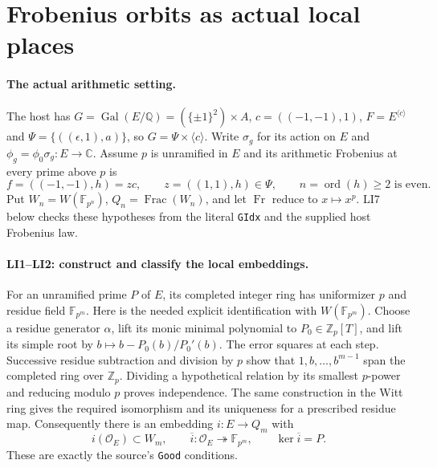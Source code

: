 \section{Frobenius orbits as actual local places}
\label{sec:local-identifications}


\paragraph{The actual arithmetic setting.}
The host has
$G=\operatorname{Gal}(E/\mathbb Q)=(\{\pm1\}^2)\times A$,
$c=((-1,-1),1)$, $F=E^{\langle c\rangle}$ and
$\Psi=\{((\epsilon,1),a)\}$, so $G=\Psi\times\langle c\rangle$.
Write $\sigma_g$ for its action on $E$ and
$\phi_g=\phi_0\sigma_g:E\to\mathbb C$.
Assume $p$ is unramified in $E$ and its arithmetic Frobenius at every
prime above $p$ is
\[
 f=((-1,-1),h)=zc,\qquad z=((1,1),h)\in\Psi,
 \qquad n=\operatorname{ord}(h)\ge2\text{ is even}.       \tag{LI.1}
\]
Put $W_n=W(\mathbb F_{p^n})$, $Q_n=\operatorname{Frac}(W_n)$,
and let $\operatorname{Fr}$ reduce to $x\mapsto x^p$.
LI7 below checks these hypotheses from the literal \texttt{GIdx}
and the supplied host Frobenius law.

\paragraph{LI1--LI2: construct and classify the local embeddings.}
For an unramified prime $P$ of $E$, its completed integer ring has
uniformizer $p$ and residue field $\mathbb F_{p^m}$. Here is the needed
explicit identification with $W(\mathbb F_{p^m})$.
Choose a residue generator $\alpha$, lift its monic minimal polynomial
to $P_0\in\mathbb Z_p[T]$, and lift its simple root by
$b\mapsto b-P_0(b)/P_0'(b)$. The error squares at each step.
Successive residue subtraction and division by $p$ show that
$1,b,\ldots,b^{m-1}$ span the completed ring over $\mathbb Z_p$.
Dividing a hypothetical relation by its smallest $p$-power and reducing
modulo $p$ proves independence. The same construction in the Witt ring
gives the required isomorphism and its uniqueness for a prescribed
residue map. Consequently there is an embedding $i:E\to Q_m$ with
\[
 i(\mathcal O_E)\subset W_m,\qquad
 \overline i:\mathcal O_E\twoheadrightarrow\mathbb F_{p^m},
 \qquad\ker\overline i=P.                               \tag{LI.2}
\]
These are exactly the source's \texttt{Good} conditions.

